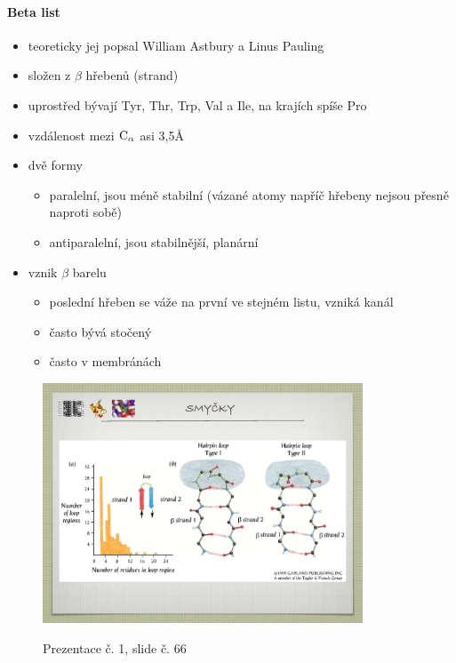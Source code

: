 \documentclass[DIV=8]{scrreprt}
\begin{document}
\paragraph{Beta list}
\begin{itemize}[nosep]
    \item teoreticky jej popsal William Astbury a Linus Pauling
    \item složen z \(\beta\) hřebenů (strand)
    \item uprostřed bývají Tyr, Thr, Trp, Val a Ile, na krajích spíše Pro
    \item vzdálenost mezi \(\ce{C_\alpha}\) asi 3,5Å
    \item dvě formy
\begin{itemize}[nosep]
    \item paralelní, jsou méně stabilní (vázané atomy napříč hřebeny nejsou přesně naproti sobě)
    \item antiparalelní, jsou stabilnější, planární
\end{itemize}

    \item vznik \(\beta\) barelu
\begin{itemize}[nosep]
    \item poslední hřeben se váže na první ve stejném listu, vzniká kanál
    \item často bývá stočený
    \item často v membránách
\end{itemize}

\end{itemize}



\begin{figure}
    \caption{Prezentace č. 1, slide č. 66}
    \includegraphics[width=0.85\textwidth]{slides-1/slide-66.jpg}
    \centering
    \label{slides-1-slide-66}
\end{figure}
\end{document}
